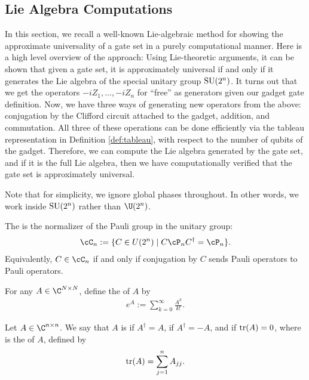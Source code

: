 \subsection{Lie Algebra Computations}
\label{subsec:lie-algebra-computations}

In this section, we recall a well-known Lie-algebraic method for showing the approximate universality of a gate set in a purely computational manner. Here is a high level overview of the approach: Using Lie-theoretic arguments, it can be shown that given a gate set, it is approximately universal if and only if it generates the Lie algebra of the special unitary group $\operatorname{SU}(2^n)$. It turns out that we get the operators $-iZ_1, \ldots, -iZ_n$ for ``free'' as generators given our gadget gate definition. Now, we have three ways of generating new operators from the above: conjugation by the Clifford circuit attached to the gadget, addition, and commutation. All three of these operations can be done efficiently via the tableau representation in Definition \ref{def:tableau}, with respect to the number of qubits of the gadget. Therefore, we can compute the Lie algebra generated by the gate set, and if it is the full Lie algebra, then we have computationally verified that the gate set is approximately universal.

Note that for simplicity, we ignore global phases throughout. In other words, we work inside $\operatorname{SU}(2^n)$ rather than $\U(2^n)$.

\begin{definition}
\label{def:clifford-group}
The  is the normalizer of the Pauli group in the unitary group:
\begin{align}
    \cC_n
    :=
    \{ C \in U(2^n) \mid C \cP_n C^\dagger = \cP_n \}.
\end{align}
Equivalently, $C \in \cC_n$ if and only if conjugation by $C$ sends Pauli operators to Pauli operators.
\end{definition}

\begin{definition}
\label{def:matrix-exponential}
For any $A \in \C^{N \times N}$, define the  of $A$ by
\begin{align}
    e^A
    :=
    \sum_{k=0}^\infty \frac{A^k}{k!}.
\end{align}
\end{definition}

\begin{definition}
\label{def:hermitian-skew-traceless}
Let $A \in \C^{n \times n}$. We say that $A$ is  if $A^\dagger=A$,  if $A^\dagger=-A$, and  if $\tr(A)=0$, where  is the  of $A$, defined by
\begin{align}
    \tr(A)
    =
    \sum_{j=1}^n A_{jj}.
\end{align}
\end{definition}

